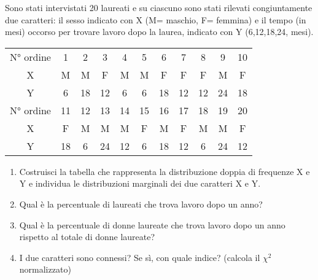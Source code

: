 \begin{esercizio}
\label{ese:c_stat_006}
Sono stati intervistati 20 laureati e su ciascuno sono stati rilevati 
congiuntamente due caratteri: il sesso indicato con X (M= maschio, F= 
femmina) e il tempo (in mesi) occorso per trovare lavoro dopo la laurea, 
indicato con Y (6,12,18,24, mesi).
\begin{center}
\begin{tabular}{ccccccccccc}
\toprule
N° ordine & 1 & 2 & 3 & 4 & 5 & 6 & 7 & 8 & 9 & 10 \\
X & M & M & F & M & M & F & F & F & M & F \\
Y & 6 & 18 & 12 & 6 & 6& 18 & 12 & 12 & 24 & 18\\
\midrule
N° ordine & 11 & 12 & 13 & 14 & 15 & 16 & 17 & 18 & 19 & 20 \\
X & F & M & M & M & F & M & F & M & M & F\\
Y & 18 & 6 & 24 & 12 & 6 & 18 & 12 & 6 &24 & 12\\
\bottomrule
\end{tabular}
\end{center}

\begin{enumerate}
\item Costruisci la tabella che rappresenta la distribuzione doppia 
di frequenze X e Y e individua le distribuzioni marginali dei due 
caratteri X e Y.
\item Qual è la percentuale di laureati che trova lavoro dopo un anno?
\item Qual è la percentuale di donne laureate che trova lavoro dopo 
un anno rispetto al totale di donne laureate?
\item I due caratteri sono connessi? Se sì, con quale indice? 
(calcola il $\chi^2$ normalizzato)
\end{enumerate}
\end{esercizio}

\subsubsection*{}

